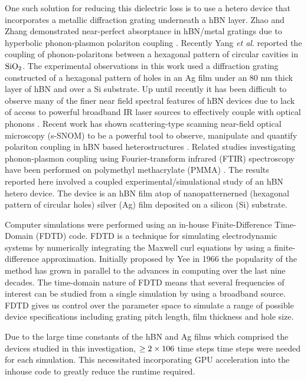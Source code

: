 \documentclass[
reprint,
amsmath,amssymb,
aip,
jap,
floatfix,
]{revtex4-2}
\begin{document}
    One such solution for reducing this dielectric loss is to use a hetero device that incorporates a metallic diffraction grating underneath a hBN layer. Zhao and Zhang demonstrated near-perfect absorptance in hBN/metal gratings due to hyperbolic phonon-plasmon polariton coupling \cite{Zhao:17}. Recently Yang \textit{et al}.\cite{Yang:20} reported the coupling of phonon-polaritons between a hexagonal pattern of circular cavities in $\rm SiO_{2}$. The experimental observations in this work used a diffraction grating constructed of a hexagonal pattern of holes in an Ag film under an 80 nm thick layer of hBN and over a Si substrate. Up until recently it has been difficult to observe many of the finer near field spectral features of hBN devices due to lack of access to powerful broadband IR laser sources to effectively couple with optical phonons \cite{Yang:20, Alfaro-Mozaz:17, Autore:18}. Recent work has shown scattering-type scanning near-field optical microscopy (s-SNOM) to be a powerful tool to observe, manipulate and quantify polariton coupling in hBN based heterostructures \cite{Fali:19, Folland:18}. Related studies investigating phonon-plasmon coupling using Fourier-transform infrared (FTIR) spectroscopy have been performed on polymethyl methacrylate (PMMA) \cite{Cheng:15, Wan:16}. The results reported here involved a coupled experimental/simulational study of an hBN hetero device. The device is an hBN film atop of nanopatternerned (hexagonal pattern of circular holes) silver (Ag) film deposited on a silicon (Si) substrate.

    Computer simulations were performed using an in-house Finite-Difference Time-Domain (FDTD) code. FDTD is a technique for simulating electrodynamic systems by numerically integrating the Maxwell curl equations by using a finite-difference approximation. Initially proposed by Yee in 1966 \cite{Kane:66} the popularity of the method has grown in parallel to the advances in computing over the last nine decades. The time-domain nature of FDTD means that several frequencies of interest can be studied from a single simulation by using a broadband source. FDTD gives us control over the parameter space to simulate a range of possible device specifications including grating pitch length, film thickness and hole size.

    Due to the large time constants of the hBN and Ag films which comprised the devices studied in this investigation, $\rm \geq 2 \times 106$ time steps time steps were needed for each simulation. This necessitated incorporating GPU acceleration into the inhouse code to greatly reduce the runtime required.
\end{document}
